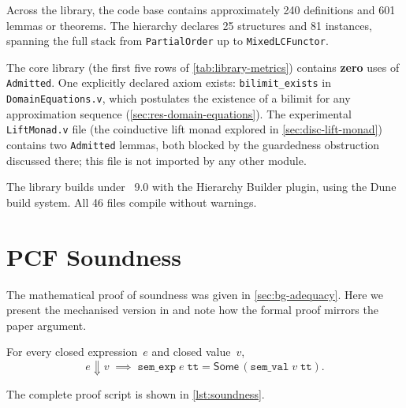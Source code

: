 Across the library, the code base contains approximately 240
definitions and 601 lemmas or theorems.
The \HB{} hierarchy declares 25 structures and 81 instances,
spanning the full stack from \texttt{PartialOrder} up to
\texttt{MixedLCFunctor}.

The core library (the first five rows of \cref{tab:library-metrics})
contains \textbf{zero} uses of \texttt{Admitted}.  One explicitly
declared axiom exists: \texttt{bilimit\_exists} in
\texttt{DomainEquations.v}, which postulates the existence of a
bilimit for any approximation sequence
(\cref{sec:res-domain-equations}).  The experimental
\texttt{LiftMonad.v} file (the coinductive lift monad explored in
\cref{sec:disc-lift-monad}) contains two \texttt{Admitted} lemmas,
both blocked by the guardedness obstruction discussed there; this file
is not imported by any other module.

The library builds under \Rocq~9.0 with the Hierarchy Builder
plugin, using the Dune build system.  All 46 files compile
without warnings.

\section{PCF Soundness}
\label{sec:res-soundness}


The mathematical proof of soundness was given in \cref{sec:bg-adequacy}.
Here we present the mechanised version in \Rocq{} and note how the
formal proof mirrors the paper argument.

\begin{theorem}
\label{thm:mech-soundness}
For every closed expression~$e$ and closed value~$v$,
\[
  e \Downarrow v
  \;\implies\;
  \texttt{sem\_exp}\;e\;\mathtt{tt}
    = \mathsf{Some}\,(\texttt{sem\_val}\;v\;\mathtt{tt}).
\]
\end{theorem}

\noindent
The complete proof script is shown in \cref{lst:soundness}.

